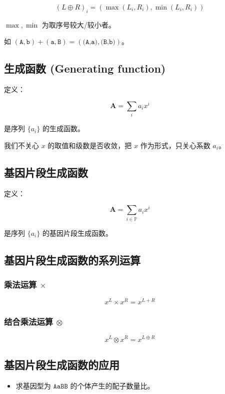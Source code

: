 \documentclass{article}
\begin{document}
	$$(L \oplus R)_i=(\max(L_i,R_i),\min(L_i,R_i))$$

	$\max,\min$ 为取序号较大/较小者。

	如 $(\texttt{A},\texttt{b}) + (\texttt{a},\texttt{B})=(\texttt{(A,a)},\texttt{(B,b)})$。

	\subsection{生成函数 (Generating function)} 
	
	定义：

	$$\textbf{A}=\sum_{i} a_i x^{i}$$

	是序列 $\{a_i\}$ 的生成函数。

	我们不关心 $x$ 的取值和级数是否收敛，把 $x$ 作为形式，只关心系数 $a_i$。

	\subsection{基因片段生成函数}

	定义：

	$$\textbf{A}=\sum_{i \in \mathbb{P}} a_i x^{i}$$

	是序列 $\{a_i\}$ 的基因片段生成函数。

	\subsection{基因片段生成函数的系列运算}
	
	\subsubsection{乘法运算 $\times$}
	
	$$x^L \times x^R=x^{L+R}$$

	\subsubsection{结合乘法运算 $\otimes$}

	$$x^L \otimes x^R=x^{L \oplus R}$$

	\subsection{基因片段生成函数的应用}

	\begin{itemize}
		\item 求基因型为 $\texttt{AaBB}$ 的个体产生的配子数量比。
	\end{itemize}
\end{document}
